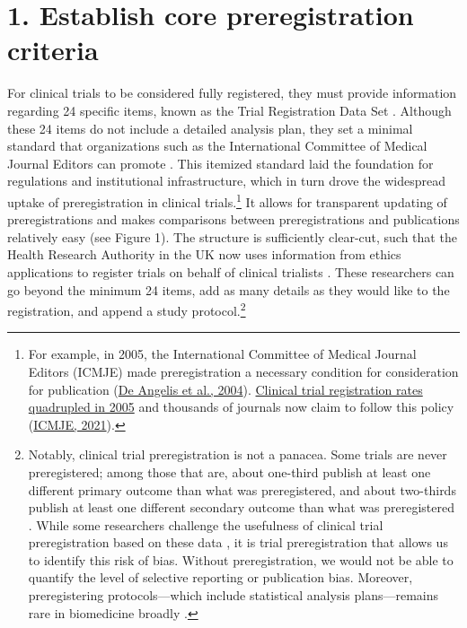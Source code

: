\documentclass[authordate, meta]{jote-new-article}
\begin{document}
\section{1. Establish core preregistration criteria}



For clinical trials to be considered fully registered, they must provide information regarding 24 specific items, known as the Trial Registration Data Set \parencites{Organization2017}. Although these 24 items do not include a detailed analysis plan, they set a minimal standard that organizations such as the International Committee of Medical Journal Editors can promote \parencites{ICMJE2019, ICMJE2021}. This itemized standard laid the foundation for regulations and institutional infrastructure, which in turn drove the widespread uptake of preregistration in clinical trials.\footnote{ For example, in 2005, the International Committee of Medical Journal Editors (ICMJE) made preregistration a necessary condition for consideration for publication (\href{https://www.medrxiv.org/content/10.1101/2021.07.07.21259868v3.full-text}{De Angelis et al., 2004}). \href{http://web.archive.org/save/https://clinicaltrials.gov/ct2/resources/trends}{Clinical trial registration rates quadrupled in 2005} and thousands of journals now claim to follow this policy (\href{https://www.medrxiv.org/content/10.1101/2021.07.07.21259868v3.full-text}{ICMJE, 2021}).} It allows for transparent updating of preregistrations and makes comparisons between preregistrations and publications relatively easy (see Figure 1). The structure is sufficiently clear-cut, such that the Health Research Authority in the UK now uses information from ethics applications to register trials on behalf of clinical trialists \parencites{Authority2021}. These researchers can go beyond the minimum 24 items, add as many details as they would like to the registration, and append a study protocol.\footnote{ Notably, clinical trial preregistration is not a panacea. Some trials are never preregistered; among those that are, about one-third publish at least one different primary outcome than what was preregistered, and about two-thirds publish at least one different secondary outcome than what was preregistered \parencites{TARG2021}. While some researchers challenge the usefulness of clinical trial preregistration based on these data \parencites[e.g.,][]{Lash2022}{Abrams2020}, it is trial preregistration that allows us to identify this risk of bias. Without preregistration, we would not be able to quantify the level of selective reporting or publication bias. Moreover, preregistering protocols—which include statistical analysis plans—remains rare in biomedicine broadly \parencites{Serghiou2021}.}
\end{document}
